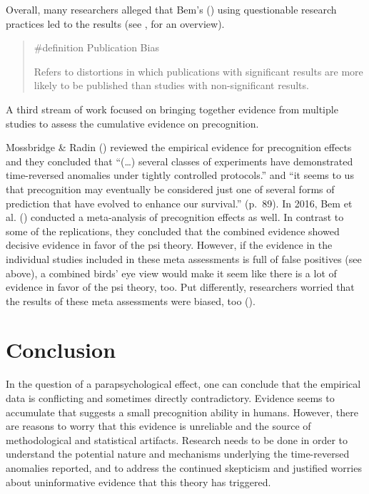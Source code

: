 \documentclass[
  letterpaper,
]{book}
\begin{document}
Overall, many researchers alleged that Bem's
() using questionable research
practices led to the results (see
, for an overview).

\begin{quote}
\label{def-publicationbias}{\#definition} Publication
Bias

Refers to distortions in which publications with significant results are
more likely to be published than studies with non-significant results.
\end{quote}

A third stream of work focused on bringing together evidence from
multiple studies to assess the cumulative evidence on precognition.

Mossbridge \& Radin () reviewed
the empirical evidence for precognition effects and they concluded that
``(\ldots) several classes of experiments have demonstrated
time-reversed anomalies under tightly controlled protocols.'' and ``it
seems to us that precognition may eventually be considered just one of
several forms of prediction that have evolved to enhance our survival.''
(p.~89). In 2016, Bem et al.
() conducted a
meta-analysis of precognition effects as well. In contrast to some of
the replications, they concluded that the combined evidence showed
decisive evidence in favor of the psi theory. However, if the evidence
in the individual studies included in these meta assessments is full of
false positives (see above), a combined birds' eye view would make it
seem like there is a lot of evidence in favor of the psi theory, too.
Put differently, researchers worried that the results of these meta
assessments were biased, too
().

\section{Conclusion}\label{conclusion-5}

In the question of a parapsychological effect, one can conclude that the
empirical data is conflicting and sometimes directly contradictory.
Evidence seems to accumulate that suggests a small precognition ability
in humans. However, there are reasons to worry that this evidence is
unreliable and the source of methodological and statistical artifacts.
Research needs to be done in order to understand the potential nature
and mechanisms underlying the time-reversed anomalies reported, and to
address the continued skepticism and justified worries about
uninformative evidence that this theory has triggered.
\end{document}
